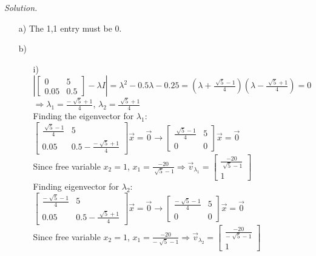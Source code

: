 \documentclass[12pt]{article}
\begin{document}
\textit{Solution.}
\begin{itemize}
\item[a)] The 1,1 entry must be 0.
\item[b)]
	\begin{itemize}
	\item[i)] $\left|\begin{bmatrix}
			    0 & 5 \\ 0.05 & 0.5	
			   \end{bmatrix} -\lambda I\right|=\lambda^2-0.5\lambda-0.25=
               \left(\lambda+\frac{\sqrt[]{5} - 1}{4} \right)\left(\lambda-\frac{\sqrt[]{5} + 1}{4} \right)=0$ \\
               $\Rightarrow \lambda_1=\frac{-\sqrt[]{5} + 1}{4}$, $\lambda_2=\frac{\sqrt[]{5} + 1}{4}$ \\
               Finding the eigenvector for $\lambda_1$:
               $\begin{bmatrix}
               \frac{\sqrt[]{5}-1}{4} & 5 \\ 0.05 & 0.5-\frac{-\sqrt[]{5}+1}{4}
               \end{bmatrix}\vec{x}=\vec{0} \longrightarrow 
               \begin{bmatrix}
               \frac{\sqrt[]{5}-1}{4} & 5 \\ 0 & 0
               \end{bmatrix}\vec{x}=\vec{0}$ \\
               Since free variable $x_2=1$, $x_1=\frac{-20}{\sqrt[]{5}-1} \Rightarrow 
               \vec{v}_{\lambda_1}= \begin{bmatrix} \frac{-20}{\sqrt[]{5}-1} \\ 1 \end{bmatrix}$ \\
               Finding eigenvector for $\lambda_2$: 
               $\begin{bmatrix}
               \frac{-\sqrt[]{5}-1}{4} & 5 \\ 0.05 & 0.5 - \frac{\sqrt[]{5}+1}{4}
               \end{bmatrix}\vec{x}=\vec{0} \longrightarrow 
                \begin{bmatrix} \frac{-\sqrt[]{5}-1}{4} & 5 \\ 0 & 0 \end{bmatrix}\vec{x}=\vec{0}$ \\
                Since free variable $x_2=1$, $x_1=\frac{-20}{-\sqrt[]{5}-1} \Rightarrow 
                \vec{v}_{\lambda_2}=\begin{bmatrix} \frac{-20}{-\sqrt[]{5}-1} \\ 1\end{bmatrix}$

\end{itemize}
\end{itemize}
\end{document}
